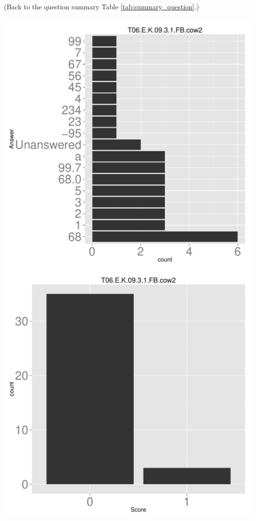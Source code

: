 \documentclass[12pt,nohyper]{tufte-handout}\usepackage[]{graphicx}\usepackage[]{color}
\begin{document}
 (Back to the question summary Table \ref{tab:summary_question}.)

\begin{center} \includegraphics[width=.45\linewidth]{Topic06_31_answer} \includegraphics[width=.45\linewidth]{Topic06_31_score} \end{center} 
\end{document}
